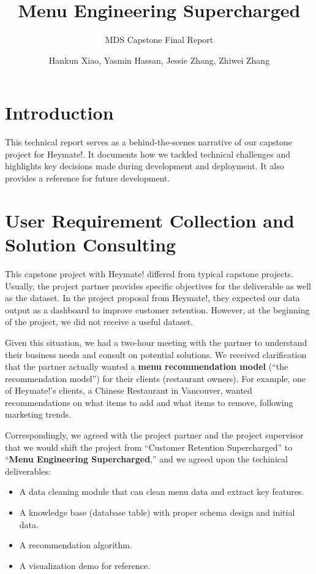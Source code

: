 \documentclass[
  11pt,
  a4paper,
  DIV=11,
  numbers=noendperiod]{scrartcl}
\title{Menu Engineering Supercharged}
\subtitle{MDS Capstone Final Report}
\author{Hankun Xiao, Yasmin Hassan, Jessie Zhang, Zhiwei Zhang}
\date{}
\providecommand{\tightlist}{%
  \setlength{\itemsep}{0pt}\setlength{\parskip}{0pt}}\usepackage{longtable,booktabs,array}
\renewcommand*\contentsname{Table of contents}
\newcommand\contentsname{Table of contents}
\begin{document}
\maketitle

\renewcommand*\contentsname{Table of contents}
{
\hypersetup{linkcolor=}
\setcounter{tocdepth}{2}
\tableofcontents
}

\section{Introduction}\label{introduction}

This technical report serves as a behind-the-scenes narrative of our
capstone project for Heymate!. It documents how we tackled technical
challenges and highlights key decisions made during development and
deployment. It also provides a reference for future development.

\section{User Requirement Collection and Solution
Consulting}\label{user-requirement-collection-and-solution-consulting}

This capstone project with Heymate! differed from typical capstone
projects. Usually, the project partner provides specific objectives for
the deliverable as well as the dataset. In the project proposal from
Heymate!, they expected our data output as a dashboard to improve
customer retention. However, at the beginning of the project, we did not
receive a useful dataset.

Given this situation, we had a two-hour meeting with the partner to
understand their business needs and consult on potential solutions. We
received clarification that the partner actually wanted a \textbf{menu
recommendation model} (``the recommendation model'') for their clients
(restaurant owners). For example, one of Heymate!'s clients, a Chinese
Restaurant in Vancouver, wanted recommendations on what items to add and
what items to remove, following marketing trends.

Correspondingly, we agreed with the project partner and the project
supervisor that we would shift the project from ``Customer Retention
Supercharged'' to ``\textbf{Menu Engineering Supercharged},'' and we
agreed upon the techinical deliverables:

\begin{itemize}
\tightlist
\item
  A data cleaning module that can clean menu data and extract key
  features.
\item
  A knowledge base (database table) with proper schema design and
  initial data.
\item
  A recommendation algorithm.
\item
  A visualization demo for reference.
\end{itemize}
\end{document}
